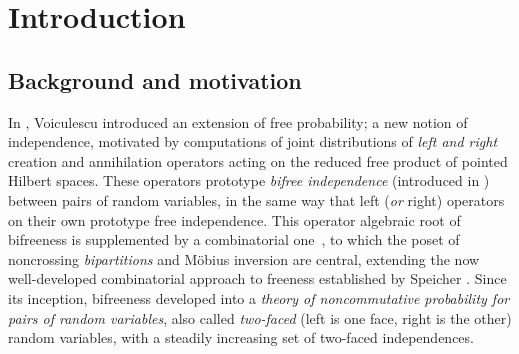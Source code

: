 \documentclass[pdftex]{sigma}
\numberwithin{equation}{section}
\begin{document}



\renewcommand{\thefootnote}{\arabic{footnote}}
\setcounter{footnote}{0}

\section{Introduction}


\subsection{Background and motivation}
In \cite{voiculescu2014free}, Voiculescu introduced an extension of free probability; a new notion of independence, motivated by computations of joint distributions of \emph{left and right} creation and annihilation operators acting on the reduced free product of pointed Hilbert spaces. These operators prototype \emph{bifree independence} (introduced in \cite{charlesworth2015combinatorics, voiculescu2014free}) between pairs of random variables, in the same way that left (\emph{or} right) operators on their own prototype free independence. This operator algebraic root of bifreeness is supplemented by a combinatorial one~\cite{charlesworth2015combinatorics}, to which the poset of noncrossing \emph{bipartitions} and M\"obius inversion are central, extending the now well-developed combinatorial approach to freeness established by Speicher \cite{nica2006lectures, Speicher1994freecumulants}.
Since its inception, bifreeness developed into a \emph{theory of noncommutative probability for pairs of random variables}, also called \emph{two-faced} (left is one face, right is the other) random variables, with a steadily increasing set of two-faced independences.
\end{document}
